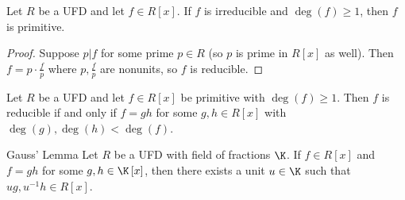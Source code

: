 \documentclass[pmath347]{subfiles}
\begin{document}
    \begin{prop}{}
        Let $R$ be a UFD and let $f\in R\left[ x \right]$. If $f$ is irreducible and $\deg\left( f \right) \geq 1$, then $f$ is primitive.
    \end{prop}

    \begin{proof}
        Suppose $p|f$ for some prime $p\in R$ (so $p$ is prime in $R\left[ x \right]$ as well). Then $f=p\cdot \frac{f}{p}$ where $p,\frac{f}{p}$ are nonunits, so $f$ is reducible.
    \end{proof}

    \begin{prop}{}
        Let $R$ be a UFD and let $f\in R\left[ x \right]$ be primitive with $\deg\left( f \right) \geq 1$. Then $f$ is reducible if and only if $f=gh$ for some $g,h\in R\left[ x \right]$ with $\deg\left( g \right) , \deg\left( h \right) < \deg\left( f \right)$.
    \end{prop}

    \begin{theorem}{Gauss' Lemma}
        Let $R$ be a UFD with field of fractions $\K$. If $f\in R\left[ x \right]$ and $f=gh$ for some $g,h\in\K\left[ x \right]$, then there exists a unit $u\in\K$ such that $ug, u^{-1} h\in R\left[ x \right]$.
    \end{theorem}
\end{document}
